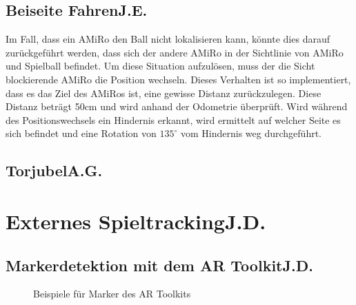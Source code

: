 
\subsection[Beiseite Fahren]{Beiseite Fahren\hfill {\normalsize J.E.}} %
Im Fall, dass ein AMiRo den Ball nicht lokalisieren kann, könnte dies darauf zurückgeführt werden, dass sich der andere AMiRo in der Sichtlinie von AMiRo und Spielball befindet. Um diese Situation aufzulösen, muss der die Sicht blockierende AMiRo die Position wechseln.
Dieses Verhalten ist so implementiert, dass es das Ziel des AMiRos ist, eine gewisse Distanz zurückzulegen. Diese Distanz beträgt 50cm und wird anhand der Odometrie überprüft.
Wird während des Positionswechsels ein Hindernis erkannt, wird ermittelt auf welcher Seite es sich befindet und eine Rotation von $135^\circ$ vom Hindernis weg durchgeführt.

\subsection[Torjubel]{Torjubel\hfill {\normalsize A.G.}} %

\section[Externes Spieltracking]{Externes Spieltracking\hfill {\normalsize J.D.}} %

\subsection[Markerdetektion mit dem AR Toolkit]{Markerdetektion mit dem AR Toolkit\hfill {\normalsize J.D.}} %
\begin{figure}
	\begin{center}
		\caption{Beispiele für Marker des AR Toolkits}
	\end{center}
\end{figure}

